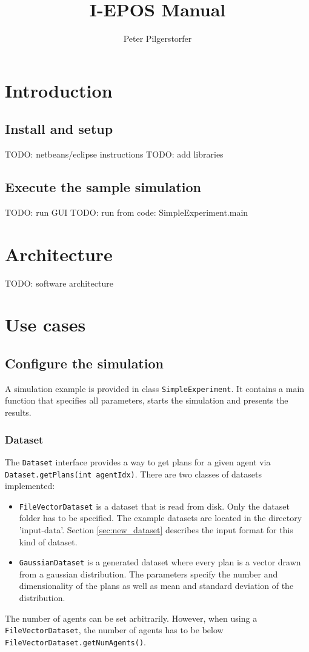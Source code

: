 \documentclass[11pt]{article} %
\title{I-EPOS Manual}
\author{Peter Pilgerstorfer}
\newcommand{\code}{\texttt}
\begin{document}
\maketitle

\section{Introduction}

\subsection{Install and setup}
TODO: netbeans/eclipse instructions
TODO: add libraries

\subsection{Execute the sample simulation}
TODO: run GUI
TODO: run from code: SimpleExperiment.main

\section{Architecture}
TODO: software architecture

\section{Use cases}
\subsection{Configure the simulation}
A simulation example is provided in class \code{SimpleExperiment}. It contains a main function that specifies all parameters, starts the simulation and presents the results.

\subsubsection*{Dataset}
The \code{Dataset} interface provides a way to get plans for a given agent via \code{Dataset.getPlans(int agentIdx)}.
There are two classes of datasets implemented:
\begin{itemize}
	\item \code{FileVectorDataset} is a dataset that is read from disk. Only the dataset folder has to be specified. The example datasets are located in the directory 'input-data'. Section \ref{sec:new_dataset} describes the input format for this kind of dataset.
	\item \code{GaussianDataset} is a generated dataset where every plan is a vector drawn from a gaussian distribution. The parameters specify the number and dimensionality of the plans as well as mean and standard deviation of the distribution.
\end{itemize}
The number of agents can be set arbitrarily. However, when using a \code{FileVectorDataset}, the number of agents has to be below \code{FileVectorDataset.getNumAgents()}.
\end{document}
